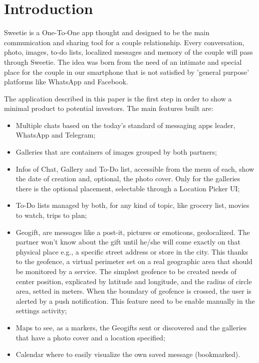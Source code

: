 
\section{Introduction}
\label{sec:introduction}

Sweetie is a One-To-One app thought and designed to be the main communication and sharing
tool for a couple relationship. Every conversation, photo, images, to-do lists, localized messages and memory of the couple will pass through Sweetie. The idea was born from the need of an intimate and special place for the couple in our smartphone that is not satisfied by 'general purpose' platforms like WhatsApp and Facebook.

The application described in this paper is the first step in order to show a minimal product to potential investors. The main features built are:

\begin{itemize}
	\item Multiple chats based on the today's standard of messaging apps leader, WhatsApp and Telegram;
	\item Galleries that are containers of images grouped by both partners;
	\item Infos of Chat, Gallery and To-Do list, accessible from the menu of each, show the date of creation and, optional, the photo cover. Only for the galleries there is the optional placement, selectable through a Location Picker UI;
	\item To-Do lists managed by both, for any kind of topic, like grocery list, movies to watch, trips to plan;
	\item Geogift, are messages like a post-it, pictures or emoticons, geolocalized. The partner won't know about the gift until he/she will come exactly on that physical place e.g., a specific street address or store in the city. This thanks to the geofence, a virtual perimeter set on a real geographic area that should be monitored by a service. The simplest geofence to be created needs of center position, explicated by latitude and longitude, and the radius of circle area, setted in meters. When the boundary of geofence is crossed, the user is alerted by a push notification. This feature need to be enable manually in the settings activity;
	\item Maps to see, as a markers, the Geogifts sent or discovered and the galleries that have a photo cover and a location specified;
	\item Calendar where to easily visualize the own saved message (bookmarked).
\end{itemize}

